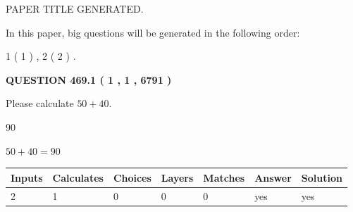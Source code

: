 \documentclass[12pt]{article}
\begin{document}
   
   
   
   
   
 \vspace{0.2in}
 
 
 
 
   
   
 PAPER TITLE GENERATED.
   
   
   
\vspace{0.2in}
   
In this paper, big questions will be generated in the following order: 
   
   
   1 ( 1 )
 ,
   2 ( 2 )
 .
  
\vspace{0.2in}
  
{\textbf{\Large{QUESTION
469.1 
 ( 1 , 1 , 6791 )
}}}
  
  
 
Please calculate $ %
50 +  %
40 $.
 
 
 
\noindent{}
 
 

90
 
 
\noindent{}
 
 

 
 
 
\noindent{}
 
 

$ %
50 +  %
40=   %
90$
 
 
\noindent{}
 
 

 
   
   
   
   
\noindent\begin{tabular}{|l|l|l|l|l|l|l|}
 \hline
Inputs & Calculates & Choices & Layers & Matches & Answer & Solution \\ \hline
 2  & 
 1  & 
 0
  & 
 0  & 
 0  & 
  yes & 
  yes 
  \\ \hline
 \end{tabular}
   
   
   
   
\noindent{}
   
\end{document}
